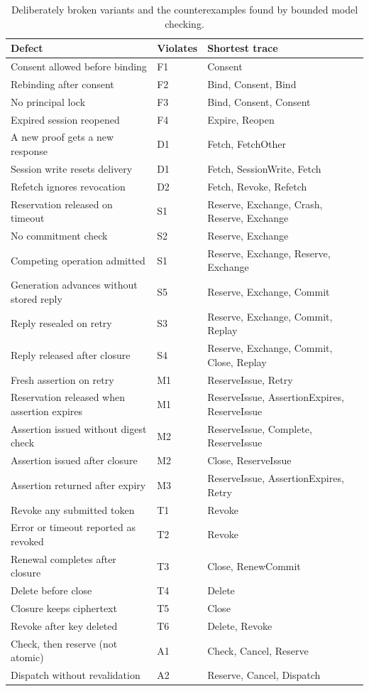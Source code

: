 \documentclass[11pt]{article}
\begin{document}
\begin{table}[t]
\centering
\small
\begin{tabular}{@{}p{}lp{}@{}}
\toprule
Defect & Violates & Shortest trace \\
\midrule
Consent allowed before binding & F1 & Consent \\
Rebinding after consent & F2 & Bind, Consent, Bind \\
No principal lock & F3 & Bind, Consent, Consent \\
Expired session reopened & F4 & Expire, Reopen \\
A new proof gets a new response & D1 & Fetch, FetchOther \\
Session write resets delivery & D1 & Fetch, SessionWrite, Fetch \\
Refetch ignores revocation & D2 & Fetch, Revoke, Refetch \\
Reservation released on timeout & S1 & Reserve, Exchange, Crash, Reserve, Exchange \\
No commitment check & S2 & Reserve, Exchange \\
Competing operation admitted & S1 & Reserve, Exchange, Reserve, Exchange \\
Generation advances without stored reply & S5 & Reserve, Exchange, Commit \\
Reply resealed on retry & S3 & Reserve, Exchange, Commit, Replay \\
Reply released after closure & S4 & Reserve, Exchange, Commit, Close, Replay \\
Fresh assertion on retry & M1 & ReserveIssue, Retry \\
Reservation released when assertion expires & M1 & ReserveIssue, AssertionExpires, ReserveIssue \\
Assertion issued without digest check & M2 & ReserveIssue, Complete, ReserveIssue \\
Assertion issued after closure & M2 & Close, ReserveIssue \\
Assertion returned after expiry & M3 & ReserveIssue, AssertionExpires, Retry \\
Revoke any submitted token & T1 & Revoke \\
Error or timeout reported as revoked & T2 & Revoke \\
Renewal completes after closure & T3 & Close, RenewCommit \\
Delete before close & T4 & Delete \\
Closure keeps ciphertext & T5 & Close \\
Revoke after key deleted & T6 & Delete, Revoke \\
Check, then reserve (not atomic) & A1 & Check, Cancel, Reserve \\
Dispatch without revalidation & A2 & Reserve, Cancel, Dispatch \\
\bottomrule
\end{tabular}
\caption{Deliberately broken variants and the counterexamples found by bounded model checking.}
\label{tab:neg}
\end{table}
\end{document}
